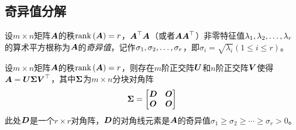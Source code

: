 \documentclass{ctexart}
\begin{document}
\subsection{奇异值分解}

\begin{definition}[奇异值]
    设\(m\times n\)矩阵\(\boldsymbol{A}\)的秩\(\mathrm{rank}\left( \boldsymbol{A} \right)=r\)，\(\boldsymbol{A}^\top\boldsymbol{A}\)（或者\(\boldsymbol{A}\boldsymbol{A}^\top\)）非零特征值\({\lambda}_1,{\lambda}_2,\dots,{\lambda}_{r}\)的算术平方根称为\(\boldsymbol{A}\)的\emph{奇异值}，记作\({\sigma}_1,{\sigma}_2,\dots,{\sigma}_{r}\)，即\(\sigma_i=\sqrt{\lambda_i}(1\le i\le r)\)。
\end{definition}

\begin{theorem}[奇异值分解]
    设\(m\times n\)矩阵\(\boldsymbol{A}\)的秩\(\mathrm{rank}\left( \boldsymbol{A} \right)=r\)，则存在\(m\)阶正交阵\(\boldsymbol{U}\)和\(n\)阶正交阵\(\boldsymbol{V}\)使得\(\boldsymbol{A}=\boldsymbol{U}\boldsymbol{\Sigma}\boldsymbol{V}^\top\)，其中\(\boldsymbol{\Sigma}\)为\(m\times n\)分块对角阵
    \begin{equation*}
        \boldsymbol{\Sigma}=\begin{bmatrix}
            \boldsymbol{D} & \boldsymbol{O} \\\boldsymbol{O}&\boldsymbol{O}
        \end{bmatrix}
    \end{equation*}
    此处\(\boldsymbol{D}\)是一个\(r\times r\)对角阵，\(\boldsymbol{D}\)的对角线元素是\(\boldsymbol{A}\)的奇异值\(\sigma_1\ge\sigma_2\ge\cdots\ge\sigma_r>0\)。
\end{theorem}
\end{document}
